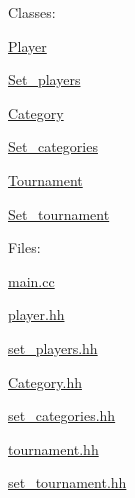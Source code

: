 Classes\+: 
\begin{DoxyItemize}
\item \mbox{\hyperlink{class_player}{Player}} 
\item \mbox{\hyperlink{class_set__players}{Set\+\_\+players}} 
\item \mbox{\hyperlink{class_category}{Category}} 
\item \mbox{\hyperlink{class_set__categories}{Set\+\_\+categories}} 
\item \mbox{\hyperlink{class_tournament}{Tournament}} 
\item \mbox{\hyperlink{class_set__tournament}{Set\+\_\+tournament}} 
\end{DoxyItemize}

Files\+: 
\begin{DoxyItemize}
\item \mbox{\hyperlink{main_8cc}{main.\+cc}} 
\item \mbox{\hyperlink{player_8hh}{player.\+hh}} 
\item \mbox{\hyperlink{set__players_8hh}{set\+\_\+players.\+hh}} 
\item \mbox{\hyperlink{category_8hh}{Category.\+hh}} 
\item \mbox{\hyperlink{set__categories_8hh}{set\+\_\+categories.\+hh}} 
\item \mbox{\hyperlink{tournament_8hh}{tournament.\+hh}} 
\item \mbox{\hyperlink{set__tournament_8hh}{set\+\_\+tournament.\+hh}} 
\end{DoxyItemize}